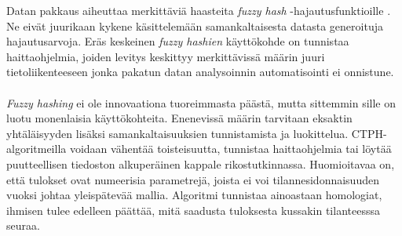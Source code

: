 \documentclass[10pt]{article}
\begin{document}
	Datan pakkaus aiheuttaa merkittäviä haasteita \textit{fuzzy hash}
	-hajautusfunktioille \parencite{RANSO}. Ne eivät juurikaan kykene käsittelemään
	samankaltaisesta datasta generoituja hajautusarvoja.
	Eräs keskeinen \textit{fuzzy hashien} käyttökohde
	on tunnistaa haittaohjelmia, joiden levitys keskittyy
	merkittävissä määrin juuri tietoliikenteeseen jonka pakatun datan
	analysoinnin automatisointi ei onnistune.

	\paragraph{}
	\textit{Fuzzy hashing} ei ole innovaationa tuoreimmasta päästä, mutta sittemmin
	sille on luotu monenlaisia käyttökohteita. Enenevissä määrin tarvitaan
	eksaktin yhtäläisyyden lisäksi samankaltaisuuksien tunnistamista ja
	luokittelua. CTPH-algoritmeilla voidaan 
	vähentää toisteisuutta,
	tunnistaa haittaohjelmia tai
	löytää puutteellisen tiedoston alkuperäinen kappale rikostutkinnassa.
	Huomioitavaa on,
	että tulokset ovat numeerisia parametrejä,
	joista ei voi tilannesidonnaisuuden vuoksi johtaa yleispätevää mallia.
	Algoritmi tunnistaa ainoastaan homologiat,
	ihmisen tulee edelleen päättää, mitä saadusta tuloksesta
	kussakin tilanteesssa seuraa.
	\printbibliography{}
\end{document}
